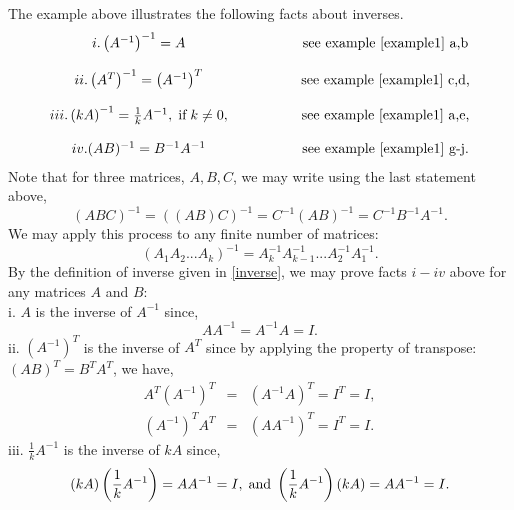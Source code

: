 \documentclass{ximera}
\begin{document}
The example above illustrates the following facts about inverses. \\
\[
\begin{array}{cc}
i. \left(A^{-1}\right)^{-1}=A &\hspace{1.5cm} \text{see example \ref{example1} a,b}\\ \\
ii. \left(A^{T}\right)^{-1}= \left(A^{-1}\right)^{T} &\hspace{1.5cm} \text{see example \ref{example1} c,d,} \\ \\
iii. \left(kA\right)^{-1}= \frac{1}{k}A^{-1}, \hspace{.1cm} \text{if}\hspace{.1cm} k\neq 0, &\hspace{1.5cm} \text{see example \ref{example1} a,e,}\\ \\
iv. (AB)^{-1}= B^{-1}A^{-1} &\hspace{1.5cm} \text{see example \ref{example1} g-j}.
\end{array}
\]
Note that for three matrices, $A, B, C$, we may write using the last statement above,
\begin{equation*}
(ABC)^{-1} = \left(\left(AB\right)C\right)^{-1} = C^{-1} \left(AB\right)^{-1} = C^{-1}B^{-1}A^{-1}.
\end{equation*}
We may apply this process to any finite number of matrices:
\begin{equation*}
\left(A_{1}A_{2}...A_{k}\right)^{-1}= A_{k}^{-1} A_{k-1}^{-1}...A_{2}^{-1}A_{1}^{-1}.
\end{equation*}
By the definition of inverse given in \eqref{inverse}, we may prove facts $i-iv$ above for any matrices $A$ and $B$:\\
i. $A$ is the inverse of $A^{-1}$ since,
\begin{equation*}
AA^{-1} = A^{-1} A = I.
\end{equation*}
ii. $\left(A^{-1}\right)^{T}$ is the inverse of $A^{T}$ since by applying the property of transpose: $(AB)^{T} = B^{T} A^{T}$, we have,
\begin{eqnarray*}
A^{T}\left(A^{-1}\right)^{T} &=& \left(A^{-1}A\right)^{T} = I^{T} = I,\\
\left(A^{-1}\right)^{T} A^{T} &=& \left(AA^{-1}\right)^{T} = I^{T} = I.
\end{eqnarray*}
iii. $\frac{1}{k}A^{-1}$ is the inverse of $kA$ since,
\begin{equation*}
(kA)\left(\frac{1}{k}A^{-1}\right) = AA^{-1}= I, \hspace{.1cm} \text{and} \hspace{.1cm} \left(\frac{1}{k}A^{-1}\right)(kA) = AA^{-1} = I.
\end{equation*}
\end{document}

